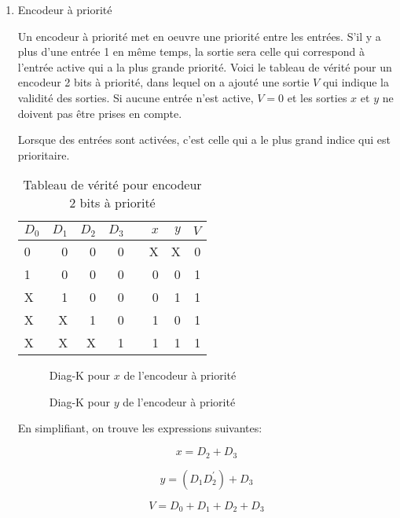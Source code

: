 \documentclass[letter, oneside]{book}
\begin{document}
\begin{enumerate}
\item Encodeur à priorité
\label{sec:orge5d2cab}

Un encodeur à priorité met en oeuvre une priorité entre les
entrées. S'il y a plus d'une entrée 1 en même temps, la sortie sera
celle qui correspond à l'entrée active qui a la plus grande
priorité. Voici le tableau de vérité pour un encodeur 2 bits à priorité,
dans lequel on a ajouté une sortie \(V\) qui indique la validité des
sorties. Si aucune entrée n'est active, \(V=0\) et les sorties \(x\)
et \(y\) ne doivent pas être prises en compte.

Lorsque des entrées sont activées, c'est celle qui a le plus grand
indice qui est prioritaire.

\begin{table}[htbp]
\caption{\label{tab:org0ad34dc}Tableau de vérité pour encodeur 2 bits à priorité}
\centering
\begin{tabular}{lrrrlrrr}
\(D_0\) & \(D_1\) & \(D_2\) & \(D_3\) &  & \(x\) & \(y\) & \(V\)\\[0pt]
\hline
0 & 0 & 0 & 0 &  & X & X & 0\\[0pt]
1 & 0 & 0 & 0 &  & 0 & 0 & 1\\[0pt]
X & 1 & 0 & 0 &  & 0 & 1 & 1\\[0pt]
X & X & 1 & 0 &  & 1 & 0 & 1\\[0pt]
X & X & X & 1 &  & 1 & 1 & 1\\[0pt]
\end{tabular}
\end{table}

\begin{figure}[htbp]
\centering

\caption{\label{fig:orgb78be0a}Diag-K pour \(x\) de l'encodeur à priorité}
\end{figure}

\begin{figure}[htbp]
\centering

\caption{\label{fig:orgd8da07e}Diag-K pour \(y\) de l'encodeur à priorité}
\end{figure}

En simplifiant, on trouve les expressions suivantes:

$$ x = D_2 + D_3 $$

$$ y = (D_1 D_2^\prime) + D_3 $$

$$ V = D_0 + D_1 + D_2 + D_3 $$


\end{enumerate}
\end{document}

